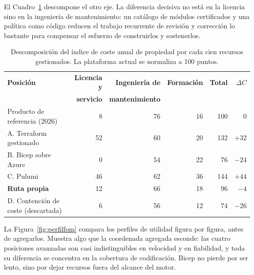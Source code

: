 \documentclass[11pt,letterpaper]{article}
\begin{document}
El Cuadro~\ref{tab:coste} descompone el otro eje. La diferencia decisiva no
está en la licencia sino en la ingeniería de mantenimiento: un catálogo de
módulos certificados y una política como código reducen el trabajo recurrente
de revisión y corrección lo bastante para compensar el esfuerzo de
construirlos y sostenerlos.

\begin{table}[htbp]
  \centering
  \footnotesize
  \setlength{\tabcolsep}{5pt}
  \caption{Descomposición del índice de coste anual de propiedad por cada cien
  recursos gestionados. La plataforma actual se normaliza a 100 puntos.}
  \label{tab:coste}
  \begin{tabular}{@{}lrrrrr@{}}
    \toprule
    \textbf{Posición} & \textbf{Licencia y} & \textbf{Ingeniería de} &
      \textbf{Formación} & \textbf{Total} & \textbf{$\Delta C$} \\
    & \textbf{servicio} & \textbf{mantenimiento} & & & \\
    \midrule
    Producto de referencia (2026) &  8 & 76 & 16 & 100 & 0 \\
    \midrule
    A. Terraform gestionado       & 52 & 60 & 20 & 132 & $+32$ \\
    B. Bicep sobre Azure          &  0 & 54 & 22 &  76 & $-24$ \\
    C. Pulumi                     & 46 & 62 & 36 & 144 & $+44$ \\
    \textbf{Ruta propia}          & 12 & 66 & 18 &  96 & $-4$ \\
    \midrule
    D. Contención de coste (descartada) & 6 & 56 & 12 & 74 & $-26$ \\
    \bottomrule
  \end{tabular}
\end{table}

La Figura~\ref{fig:perfilfom} compara los perfiles de utilidad figura por
figura, antes de agregarlos. Muestra algo que la coordenada agregada esconde:
las cuatro posiciones avanzadas son casi indistinguibles en velocidad y en
fiabilidad, y toda su diferencia se concentra en la cobertura de codificación.
Bicep no pierde por ser lento, sino por dejar recursos fuera del alcance del
motor.
\end{document}
